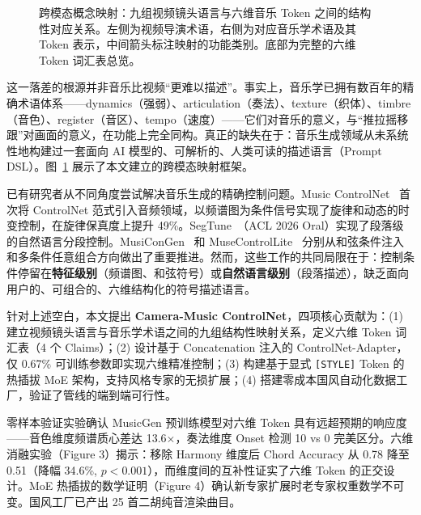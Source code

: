 \documentclass[UTF8,12pt,a4paper]{ctexart}
\begin{document}
\begin{figure}[h!]
{
}
\caption{跨模态概念映射：九组视频镜头语言与六维音乐 Token 之间的结构性对应关系。左侧为视频导演术语，右侧为对应音乐学术语及其 Token 表示，中间箭头标注映射的功能类别。底部为完整的六维 Token 词汇表总览。}
\label{fig:cross_modal_mapping}
\end{figure}

这一落差的根源并非音乐比视频“更难以描述”。事实上，音乐学已拥有数百年的精确术语体系——dynamics（强弱）、articulation（奏法）、texture（织体）、timbre（音色）、register（音区）、tempo（速度）——它们对音乐的意义，与“推拉摇移跟”对画面的意义，在功能上完全同构。真正的缺失在于：音乐生成领域从未系统性地构建过一套面向 AI 模型的、可解析的、人类可读的描述语言（Prompt DSL）。图~\ref{fig:cross_modal_mapping} 展示了本文建立的跨模态映射框架。

已有研究者从不同角度尝试解决音乐生成的精确控制问题。Music ControlNet~\cite{musiccontrolnet} 首次将 ControlNet 范式引入音频领域，以频谱图为条件信号实现了旋律和动态的时变控制，在旋律保真度上提升 49\%。SegTune~\cite{segtune}（ACL 2026 Oral）实现了段落级的自然语言分段控制。MusiConGen~\cite{musecong} 和 MuseControlLite~\cite{muselite} 分别从和弦条件注入和多条件任意组合方向做出了重要推进。然而，这些工作的共同局限在于：控制条件停留在\textbf{特征级别}（频谱图、和弦符号）或\textbf{自然语言级别}（段落描述），缺乏面向用户的、可组合的、六维结构化的符号描述语言。

针对上述空白，本文提出 \textbf{Camera-Music ControlNet}，四项核心贡献为：(1) 建立视频镜头语言与音乐学术语之间的九组结构性映射关系，定义六维 Token 词汇表（4 个 Claims）；(2) 设计基于 Concatenation 注入的 ControlNet-Adapter，仅 0.67\% 可训练参数即实现六维精准控制；(3) 构建基于显式 \texttt{[STYLE]} Token 的热插拔 MoE 架构，支持风格专家的无损扩展；(4) 搭建零成本国风自动化数据工厂，验证了管线的端到端可行性。

零样本验证实验确认 MusicGen 预训练模型对六维 Token 具有远超预期的响应度——音色维度频谱质心差达 13.6$\times$，奏法维度 Onset 检测 10 vs 0 完美区分。六维消融实验（Figure 3）揭示：移除 Harmony 维度后 Chord Accuracy 从 0.78 降至 0.51（降幅 34.6\%, $p<0.001$），而维度间的互补性证实了六维 Token 的正交设计。MoE 热插拔的数学证明（Figure 4）确认新专家扩展时老专家权重数学不可变。国风工厂已产出 25 首二胡纯音渲染曲目。
\end{document}

